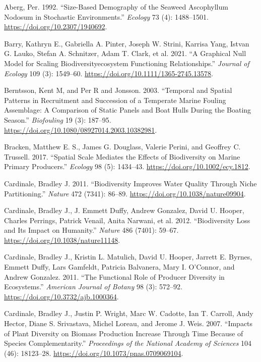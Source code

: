 \documentclass[
  letterpaper,
  DIV=11,
  numbers=noendperiod]{scrartcl}
\newlength{\cslhangindent}
\newenvironment{CSLReferences}[2] %
 {\begin{list}{}{%
  \setlength{\itemindent}{0pt}
  \setlength{\leftmargin}{0pt}
  \setlength{\parsep}{0pt}
  \ifodd #1
   \setlength{\leftmargin}{\cslhangindent}
   \setlength{\itemindent}{-1\cslhangindent}
  \fi
  \setlength{\itemsep}{#2\baselineskip}}}
 {\end{list}}
\begin{document}
\label{refs}
\begin{CSLReferences}{1}{0}
Aberg, Per. 1992. {``Size-Based Demography of the Seaweed Ascophyllum
Nodosum in Stochastic Environments.''} \emph{Ecology} 73 (4):
1488--1501. \url{https://doi.org/10.2307/1940692}.

Barry, Kathryn E., Gabriella A. Pinter, Joseph W. Strini, Karrisa Yang,
Istvan G. Lauko, Stefan A. Schnitzer, Adam T. Clark, et al. 2021. {``A
Graphical Null Model for Scaling Biodiversity{\textendash}ecosystem
Functioning Relationships.''} \emph{Journal of Ecology} 109 (3):
1549--60. \url{https://doi.org/10.1111/1365-2745.13578}.

Berntsson, Kent M, and Per R and Jonsson. 2003. {``Temporal and Spatial
Patterns in Recruitment and Succession of a Temperate Marine Fouling
Assemblage: A Comparison of Static Panels and Boat Hulls During the
Boating Season.''} \emph{Biofouling} 19 (3): 187--95.
\url{https://doi.org/10.1080/08927014.2003.10382981}.

Bracken, Matthew E. S., James G. Douglass, Valerie Perini, and Geoffrey
C. Trussell. 2017. {``Spatial Scale Mediates the Effects of Biodiversity
on Marine Primary Producers.''} \emph{Ecology} 98 (5): 1434--43.
\url{https://doi.org/10.1002/ecy.1812}.

Cardinale, Bradley J. 2011. {``Biodiversity Improves Water Quality
Through Niche Partitioning.''} \emph{Nature} 472 (7341): 86--89.
\url{https://doi.org/10.1038/nature09904}.

Cardinale, Bradley J., J. Emmett Duffy, Andrew Gonzalez, David U.
Hooper, Charles Perrings, Patrick Venail, Anita Narwani, et al. 2012.
{``Biodiversity Loss and Its Impact on Humanity.''} \emph{Nature} 486
(7401): 59--67. \url{https://doi.org/10.1038/nature11148}.

Cardinale, Bradley J., Kristin L. Matulich, David U. Hooper, Jarrett E.
Byrnes, Emmett Duffy, Lars Gamfeldt, Patricia Balvanera, Mary I.
O'Connor, and Andrew Gonzalez. 2011. {``The Functional Role of Producer
Diversity in Ecosystems.''} \emph{American Journal of Botany} 98 (3):
572--92. \url{https://doi.org/10.3732/ajb.1000364}.

Cardinale, Bradley J., Justin P. Wright, Marc W. Cadotte, Ian T.
Carroll, Andy Hector, Diane S. Srivastava, Michel Loreau, and Jerome J.
Weis. 2007. {``Impacts of Plant Diversity on Biomass Production Increase
Through Time Because of Species Complementarity.''} \emph{Proceedings of
the National Academy of Sciences} 104 (46): 18123--28.
\url{https://doi.org/10.1073/pnas.0709069104}.


\end{CSLReferences}
\end{document}
